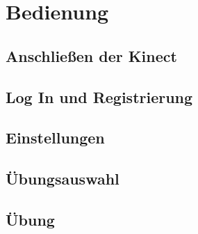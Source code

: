 

\chapter{Bedienung}


\section{Anschließen der Kinect}

\section{Log In und Registrierung}

\section{Einstellungen}

\section{Übungsauswahl}

\section{Übung}


